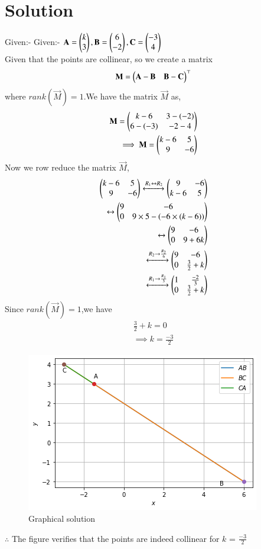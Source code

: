 \documentclass[journal,12pt,twocolumn]{IEEEtran}
\begin{document}
\section{Solution}
Given:-
Given:-
$\mathbf {A}=\begin{pmatrix}k\\3\end{pmatrix},
\mathbf {B}=\begin{pmatrix}6\\-2\end{pmatrix},
\mathbf {C}=\begin{pmatrix}-3\\4\end{pmatrix}$
\\Given that the points are collinear, so we create a matrix
\begin{align}
  \mathbf{M} =  \begin{pmatrix}\mathbf{A}-\mathbf{B}&\mathbf{B}-\mathbf{C}\end{pmatrix}^{\top}
\end{align}
where $rank(\vec{M})=1$.We have the matrix $\vec{M}$ as,
\begin{align}
    \mathbf{M} = \begin{pmatrix}k-6&3-(-2)\\6-(-3)&-2-4\end{pmatrix} \\
    \implies \mathbf{M} =   \begin{pmatrix}k-6&5\\9&-6\end{pmatrix}
\end{align}
Now we row reduce the matrix $\vec{M}$,
\begin{align}
\begin{pmatrix}k-6&5\\9&-6\end{pmatrix}
\xleftrightarrow{R_1\leftrightarrow R_2}
\begin{pmatrix}9&-6\\k-6&5\end{pmatrix}
\\
\leftrightarrow
\begin{pmatrix}9&-6\\0&9\times5-(-6\times(k-6))\end{pmatrix}
\\
\leftrightarrow
\begin{pmatrix}9&-6\\0&9+6k\end{pmatrix}
\\
\xleftrightarrow{R_2\rightarrow\frac{R_2}{6}}
\begin{pmatrix}9&-6\\0&\frac{3}{2}+k\end{pmatrix}
\\
\xleftrightarrow{R_1\rightarrow \frac{R_1}{3}}
\begin{pmatrix}1&\frac{-2}{3}\\0&\frac{3}{2}+k\end{pmatrix}
\end{align}
Since $rank(\vec{M})=1$,we have
\begin{align}
 \frac{3}{2}+k=0 \\
\implies k=\frac{-3}{2}
 \end{align}
\begin{figure}[ht]
    \centering
    \includegraphics[width=\columnwidth]{collinear.png}
    \caption{Graphical solution}
    \label{Graphical solution}
\end{figure}

$\therefore$ The figure verifies that the points are indeed collinear for $k$ = $\frac{-3}{2}$
\end{document}

